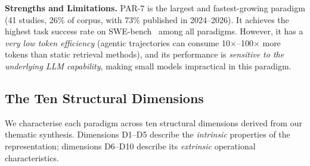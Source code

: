 \documentclass[acmsmall,screen,review]{acmart}
\begin{document}
\textbf{Strengths and Limitations.}
PAR-7 is the largest and fastest-growing paradigm (41 studies, 26\%
of corpus, with 73\% published in 2024--2026). It achieves the highest
task success rate on SWE-bench~\cite{Jimenez2024} among all paradigms.
However, it has a \emph{very low token efficiency} (agentic trajectories
can consume 10$\times$--100$\times$ more tokens than static retrieval
methods), and its performance is \emph{sensitive to the underlying LLM
capability}, making small models impractical in this paradigm.

\subsection{The Ten Structural Dimensions}
\label{subsec:dimensions}

We characterise each paradigm across ten structural dimensions derived
from our thematic synthesis. Dimensions D1--D5 describe the
\emph{intrinsic} properties of the representation; dimensions D6--D10
describe its \emph{extrinsic} operational characteristics.
\end{document}
